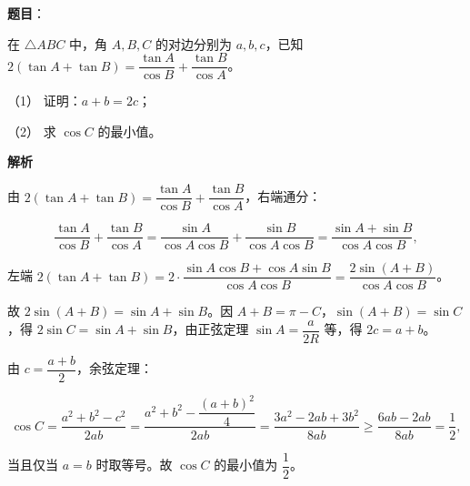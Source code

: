 \begin{answer}

\textbf{题目}：

在 \(\triangle ABC\) 中，角 \(A,B,C\) 的对边分别为 \(a,b,c\)，已知 \(2(\tan A+\tan B)=\dfrac{\tan A}{\cos B}+\dfrac{\tan B}{\cos A}\)。

（1） 证明：\(a+b=2c\)；

（2） 求 \(\cos C\) 的最小值。

\textbf{解析}


由 \(2(\tan A+\tan B)=\dfrac{\tan A}{\cos B}+\dfrac{\tan B}{\cos A}\)，右端通分：

\nopagebreak[4]
\[
\dfrac{\tan A}{\cos B}+\dfrac{\tan B}{\cos A}=\dfrac{\sin A}{\cos A\cos B}+\dfrac{\sin B}{\cos A\cos B}=\dfrac{\sin A+\sin B}{\cos A\cos B},
\]

左端 \(2(\tan A+\tan B)=2\cdot\dfrac{\sin A\cos B+\cos A\sin B}{\cos A\cos B}=\dfrac{2\sin(A+B)}{\cos A\cos B}\)。

故 \(2\sin(A+B)=\sin A+\sin B\)。因 \(A+B=\pi-C\)，\(\sin(A+B)=\sin C\)，得 \(2\sin C=\sin A+\sin B\)，由正弦定理 \(\sin A=\dfrac{a}{2R}\) 等，得 \(2c=a+b\)。


由 \(c=\dfrac{a+b}{2}\)，余弦定理：

\nopagebreak[4]
\[
\cos C=\dfrac{a^{2}+b^{2}-c^{2}}{2ab}=\dfrac{a^{2}+b^{2}-\dfrac{(a+b)^{2}}{4}}{2ab}=\dfrac{3a^{2}-2ab+3b^{2}}{8ab}\geqslant\dfrac{6ab-2ab}{8ab}=\dfrac{1}{2},
\]

当且仅当 \(a=b\) 时取等号。故 \(\cos C\) 的最小值为 \(\dfrac{1}{2}\)。



\end{answer}
